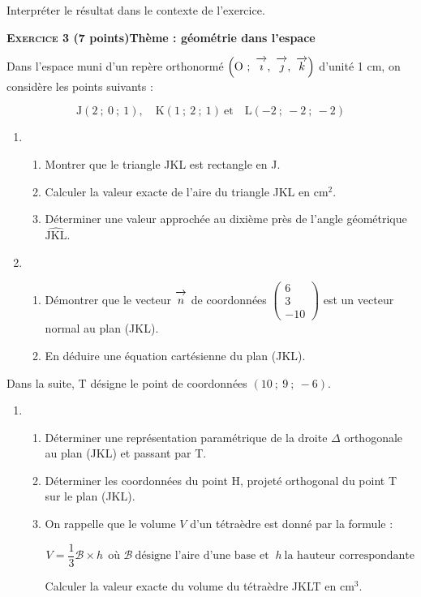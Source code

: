 \documentclass[10pt,a4paper]{article}
\newcommand{\vect}[1]{\overrightarrow{\,\mathstrut#1\,}}
\def\Oijk{$\left(\text{O}~;~\vect{\imath},~\vect{\jmath},~\vect{k}\right)$}
\begin{document}
\begin{enumerate}
\begin{enumerate}
Interpréter le résultat dans le contexte de l'exercice.
	\end{enumerate}
\end{enumerate}

\bigskip

\textbf{\textsc{Exercice 3} \quad (7 points)\hfill Thème : géométrie dans l'espace}

\medskip

Dans l'espace muni d'un repère orthonormé \Oijk{} d'unité 1 cm, on considère les points suivants :

\[\text{J}(2~;~0~;~1), \quad \text{K}( 1~;~2~;~1)\:\text{et} \quad \text{L}(-2~;~-2~;~-2)\]

\begin{enumerate}
\item 
	\begin{enumerate}
		\item Montrer que le triangle JKL est rectangle en J.
		\item Calculer la valeur exacte de l'aire du triangle JKL en cm$^2$.
		\item Déterminer une valeur approchée au dixième près de l'angle géométrique $\widehat{\text{JKL}}$.
	\end{enumerate}
		
\item
	\begin{enumerate}
		\item Démontrer que le vecteur $\vect{n}$ de coordonnées $\begin{pmatrix}6\\3\\-10\end{pmatrix}$ est un vecteur normal au plan (JKL).
		\item En déduire une équation cartésienne du plan (JKL).
	\end{enumerate}
\end{enumerate}

Dans la suite, T désigne le point de coordonnées $(10~;~9~;~-6)$.

\begin{enumerate}[resume]
\item
	\begin{enumerate}
		\item Déterminer une représentation paramétrique de la droite $\Delta$
orthogonale au plan (JKL) et passant par T.
		\item Déterminer les coordonnées du point H, projeté orthogonal du point T sur le plan (JKL).
		\item On rappelle que le volume $V$ d'un tétraèdre est donné par la formule :
		
		\[V = \dfrac13 \mathcal{B} \times h\:\: \text{où } \mathcal{B}\:\text{désigne l'aire d'une base et } \: h \: \text{la hauteur correspondante}\]
		
Calculer la valeur exacte du volume du tétraèdre JKLT en cm$^3$.
	\end{enumerate}
\end{enumerate}
\end{document}
